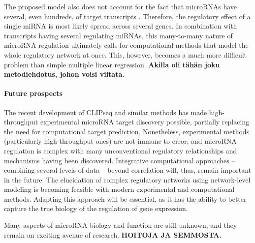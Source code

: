 The proposed model also does not account for the fact that microRNAs have
several, even hundreds, of target transcripts \citep{}. Therefore, the regulatory
effect of a single miRNA is most likely spread across several genes. In
combination with transcripts having several regulating miRNAs, this many-to-many
nature of microRNA regulation ultimately calls for computational methods
that model the whole regulatory network at once. This, however, becomes a much
more difficult problem than simple multiple linear regression. \textbf{Akilla
oli tähän joku metodiehdotus, johon voisi viitata.}

\paragraph*{Future prospects}

The recent development of CLIPseq and similar methods has made high-throughput
experimental microRNA target discovery possible, partially replacing the need
for computational target prediction. Nonetheless, experimental methods
(particularly high-throughput ones) are not immune to error, and microRNA
regulation is complex with many unconventional regulatory relationships and
mechanisms having been discovered. Integrative computational approaches --
combining several levels of data -- beyond correlation will, thus, remain
important in the future. The elucidation of complex regulatory networks using
network-level modeling is becoming feasible with modern experimental and
computational methods. Adapting this approach will be essential, as it has the
ability to better capture the true biology of the regulation of gene
expression.

Many aspects of microRNA biology and function are still unknown, and they 
remain an exciting avenue of research. \textbf{HOITOJA JA SEMMOSTA.}